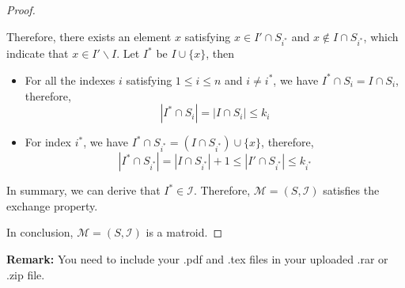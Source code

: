 \documentclass[12pt,a4paper]{article}
\theoremstyle{definition}
\begin{document}
\begin{enumerate}
\begin{proof}
\begin{itemize}
           Therefore, there exists an element $x$ satisfying $x \in I' \cap S_{i^*}$ and $x \notin I \cap S_{i^*}$, which indicate that $x \in I' \backslash I$. Let $I^*$ be $I \cup \{x\}$, then
           \begin{itemize}
           \item For all the indexes $i$ satisfying $1 \leq i \leq n$ and $i \ne i^*$, we have $I^* \cap S_i = I \cap S_i$, therefore,
           \begin{displaymath}
           |I^* \cap S_i| = |I \cap S_i| \leq k_i
           \end{displaymath}
           \item For index $i^*$, we have $I^* \cap S_{i^*} = (I \cap S_{i^*}) \cup \{x\}$, therefore,
           \begin{displaymath}
           |I^* \cap S_{i^*}| = |I \cap S_{i^*}| + 1 \leq |I' \cap S_{i^*}| \leq k_{i^*}
           \end{displaymath}
           \end{itemize}
           In summary, we can derive that $I^* \in \mathcal{I}$. Therefore, $\mathcal{M}=(S,\mathcal{I})$ satisfies the exchange property.
       \end{itemize}
       In conclusion, $\mathcal{M}=(S,\mathcal{I})$ is a matroid.
   \end{proof}
\end{enumerate}

\vspace{20pt}

\textbf{Remark:} You need to include your .pdf and .tex files in your uploaded .rar or .zip file.

\end{document}
